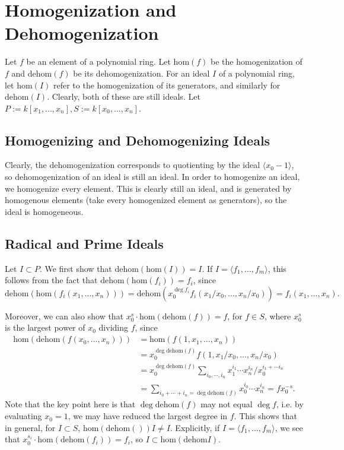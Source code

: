 \documentclass[11pt]{amsart}
\theoremstyle{named}
\renewcommand{\hom}[1]{\mathrm{hom}(#1)}
\newcommand{\dhom}[1]{\mathrm{dehom}(#1)}
\newcommand{\dehom}{\mathrm{dehom}}
\begin{document}
\section{Homogenization and Dehomogenization}
Let $f$ be an element of a polynomial ring. Let $\hom f$ be the homogenization of $f$ and $\dhom f$ be its dehomogenization. For an ideal $I$ of a polynomial ring, let $\hom I$ refer to the homogenization of its generators, and similarly for $\dhom I$. Clearly, both of these are still ideals. Let $P := k[x_1, ..., x_n], S := k[x_0, ..., x_n]$.

\subsection{Homogenizing and Dehomogenizing Ideals}
Clearly, the dehomogenization corresponds to quotienting by the ideal $\langle x_0 - 1 \rangle$, so dehomogenization of an ideal is still an ideal. In order to homogenize an ideal, we homogenize every element. This is clearly still an ideal, and is generated by homogenous elements (take every homogenized element as generators), so the ideal is homogeneous.

\subsection{Radical and Prime Ideals}
Let $I \subset P$. We first show that $\dhom {\hom I} = I$. If $I = \langle f_1, ..., f_m \rangle$, this follows from the fact that $\dhom {\hom {f_i}} = f_i$, since \[ 
\dhom {\hom {f_i(x_1, ..., x_n)}} = \dhom {x_0^{\deg f_i} f_i(x_1/x_0, ..., x_n/x_0)} = f_i(x_1, ..., x_n).\] 

Moreover, we can also show that $x_0^s \cdot \hom {\dhom f} = f$, for $f \in S$, where $x_0^s$ is the largest power of $x_0$ dividing $f$, since \begin{align*}
\hom {\dhom {f(x_0, ..., x_n)} } & = \hom {f(1, x_1, ..., x_n)} \\
& = x_0^{\deg \dhom f} f(1, x_1/x_0, ..., x_n/x_0) \\
& = x_0^{\deg \dhom f} \sum_{i_0, \cdots, i_n} x_1^{i_1} \cdots x_n^{i_n} / x_0^{i_1 + \cdots i_n} \\
& = \sum_{i_0 + \cdots + i_n = \deg \dhom f} x_0^{i_0} \cdots x_n^{i_n} = f x_0^{-s}.
\end{align*}
Note that the key point here is that $\deg \dhom f$ may not equal $\deg f$, i.e. by evaluating $x_0 = 1$, we may have reduced the largest degree in $f$. This shows that in general, for $I \subset S$, $\hom \dhom I \neq I$. Explicitly, if $I = \langle f_1, ..., f_m\rangle$, we see that $x_0^{s_i} \cdot \hom {\dhom {f_i}} = f_i$, so $I \subset \hom {\dehom I}$.
\end{document}
